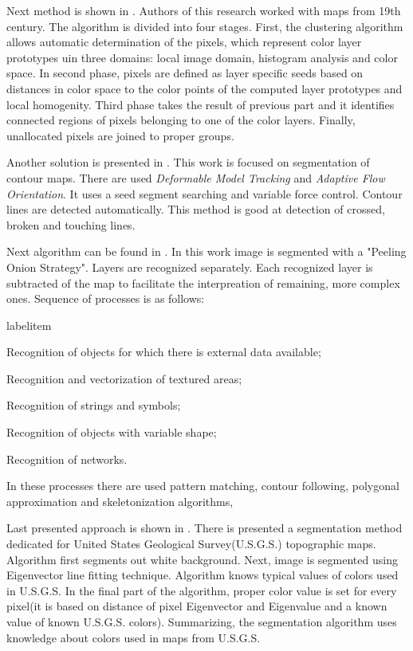 \documentclass[a4paper,onecolumn,oneside,12pt]{memoir}
\makeatletter
\renewenvironment{itemize}{
  \begin{list}{  
  \csname labelitem\romannumeral\the\@listdepth\endcsname}{
  \setlength{\leftmargin}{1em}
	\setlength{\topsep}{6pt}%
	\setlength{\partopsep}{0pt}%
	\setlength{\parskip}{0pt}%
	\setlength{\parsep}{0pt}%
	\setlength{\itemsep}{0pt}}
}{
  \end{list}
}
\makeatother
\begin{document}
Next method is shown in \cite{colorsOfThePast}. Authors of this research worked with maps from 
19th century. The algorithm is divided into four stages. First, the clustering algorithm allows 
automatic determination of the pixels, which represent color layer prototypes uin three domains:
local image domain, histogram analysis and color space. In second phase, pixels are defined as
layer specific seeds based on distances in color space to the color points of the computed layer 
prototypes and local homogenity. Third phase takes the result of previous part and it identifies 
connected regions of pixels belonging to one of the color layers. Finally, unallocated pixels are
joined to proper groups.

Another solution is presented in \cite{automaticVectorization}. This work is focused on segmentation
of contour maps. There are used \textit{Deformable Model Tracking} and \textit{Adaptive Flow 
Orientation}. It uses a seed segment searching and variable force control. Contour lines are 
detected automatically. This method is good at detection of crossed, broken and touching lines.

Next algorithm can be found in \cite{topographicMapsAutomaticVectorization}. In this work image is
segmented with a "Peeling Onion Strategy". Layers are recognized separately. Each recognized layer
is subtracted of the map to facilitate the interpreation of remaining, more complex ones. Sequence
of processes is as follows:

\begin{itemize}
  \item Recognition of objects for which there is external data available;
  \item Recognition and vectorization of textured areas;
  \item Recognition of strings and symbols;
  \item Recognition of objects with variable shape;
  \item Recognition of networks.
\end{itemize}

In these processes there are used pattern matching, contour following, polygonal approximation and
skeletonization algorithms, 

Last presented approach is shown in \cite{colorMapSegmentation}. There is presented a segmentation
method dedicated for United States Geological Survey(U.S.G.S.) topographic maps. Algorithm first 
segments out white background. Next, image is segmented using Eigenvector line fitting technique.
Algorithm knows typical values of colors used in U.S.G.S. In the final part of the algorithm, proper
color value is set for every pixel(it is based on distance of pixel Eigenvector and Eigenvalue and
a known value of known U.S.G.S. colors). Summarizing, the segmentation algorithm uses knowledge
about colors used in maps from U.S.G.S.
\end{document}
